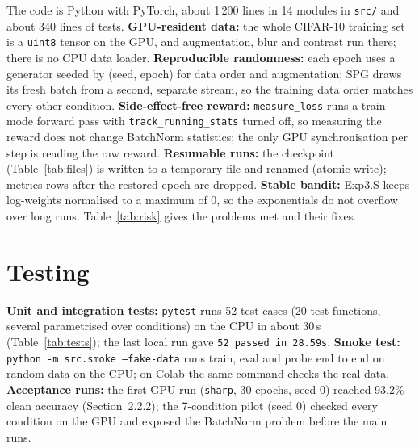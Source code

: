 \documentclass[a4paper,12pt]{report}
\newcommand{\cond}[1]{\texttt{#1}}
\begin{document}
The code is Python with PyTorch, about 1\,200 lines in 14 modules in \texttt{src/} and about 340 lines of tests. \textbf{GPU-resident data:} the whole CIFAR-10 training set is a \texttt{uint8} tensor on the GPU, and augmentation, blur and contrast run there; there is no CPU data loader. \textbf{Reproducible randomness:} each epoch uses a generator seeded by (seed, epoch) for data order and augmentation; SPG draws its fresh batch from a second, separate stream, so the training data order matches every other condition. \textbf{Side-effect-free reward:} \texttt{measure\_loss} runs a train-mode forward pass with \texttt{track\_running\_stats} turned off, so measuring the reward does not change BatchNorm statistics; the only GPU synchronisation per step is reading the raw reward. \textbf{Resumable runs:} the checkpoint (Table~\ref{tab:files}) is written to a temporary file and renamed (atomic write); metrics rows after the restored epoch are dropped. \textbf{Stable bandit:} Exp3.S keeps log-weights normalised to a maximum of 0, so the exponentials do not overflow over long runs. Table~\ref{tab:risk} gives the problems met and their fixes.

\section{Testing}

\textbf{Unit and integration tests:} \texttt{pytest} runs 52 test cases (20 test functions, several parametrised over conditions) on the CPU in about 30\,s (Table~\ref{tab:tests}); the last local run gave \texttt{52 passed in 28.59s}. \textbf{Smoke test:} \texttt{python -m src.smoke --fake-data} runs train, eval and probe end to end on random data on the CPU; on Colab the same command checks the real data. \textbf{Acceptance runs:} the first GPU run (\cond{sharp}, 30 epochs, seed 0) reached 93.2\% clean accuracy (Section~2.2.2); the 7-condition pilot (seed 0) checked every condition on the GPU and exposed the BatchNorm problem before the main runs.
\end{document}
